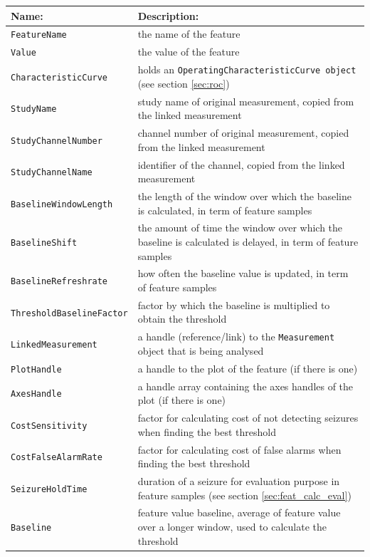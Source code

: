 \documentclass[usletter, 11pt]{extarticle}
\begin{document}
\begin{center}
	\begin{longtable}{p{5cm}|p{12cm}}
	\textbf{Name:} & \textbf{Description:} \\ \hline
	\texttt{FeatureName} & the name of the feature \\
	\texttt{Value} & the value of the feature \\
        
    \texttt{CharacteristicCurve} &  holds an \verb|OperatingCharacteristicCurve object| (see section \ref{sec:roc})  \\
        
    \texttt{StudyName} & study name of original measurement, copied from the linked measurement \\
    \texttt{StudyChannelNumber} & channel number of original measurement, copied from the linked measurement \\
    \texttt{StudyChannelName} & identifier of the channel, copied from the linked measurement \\
    \texttt{BaselineWindowLength} & the length of the window over which the baseline is calculated, in term of feature samples \\
    \texttt{BaselineShift} & the amount of time the window over which the baseline is calculated is delayed, in term of feature samples\\
    \texttt{BaselineRefreshrate} & how often the baseline value is updated, in term of feature samples \\
    
    \texttt{ThresholdBaselineFactor} & factor by which the baseline is multiplied to obtain the threshold \\
    
    \texttt{LinkedMeasurement} & a handle (reference/link) to the \verb|Measurement| object that is being analysed \\
    
    \texttt{PlotHandle} & a handle to the plot of the feature (if there is one) \\
    \texttt{AxesHandle} & a handle array containing the axes handles of the plot (if there is one) \\
    
    \texttt{CostSensitivity} & factor for calculating cost of not detecting seizures when finding the best threshold \\
    \texttt{CostFalseAlarmRate} & factor for calculating cost of false alarms when finding the best threshold \\
    \texttt{SeizureHoldTime} & duration of a seizure for evaluation purpose in feature samples (see section \ref{sec:feat_calc_eval}) \\
    \texttt{Baseline} & feature value baseline, average of feature value over a longer window, used to calculate the threshold \\
    

\end{longtable}
\end{center}
\end{document}
